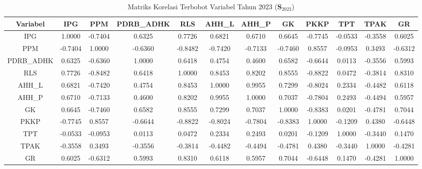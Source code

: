 \begin{table}[H]
\centering
\caption{Matriks Korelasi Terbobot Variabel Tahun 2023 ($\mathbf{S}_{2023}$)} \label{tab:appmatriks_intra_loading_2023}
\begin{adjustbox}{max width=\textwidth, max height=0.85\textheight}
\begin{tabular}{|c|c|c|c|c|c|c|c|c|c|c|c|}
\hline
\textbf{Variabel} & \textbf{IPG} & \textbf{PPM} & \textbf{PDRB\_ADHK} & \textbf{RLS} & \textbf{AHH\_L} & \textbf{AHH\_P} & \textbf{GK} & \textbf{PKKP} & \textbf{TPT} & \textbf{TPAK} & \textbf{GR} \\
\hline
IPG & 1.0000 & -0.7404 & 0.6325 & 0.7726 & 0.6821 & 0.6710 & 0.6645 & -0.7745 & -0.0533 & -0.3558 & 0.6025 \\
PPM & -0.7404 & 1.0000 & -0.6360 & -0.8482 & -0.7420 & -0.7133 & -0.7460 & 0.8557 & -0.0953 & 0.3493 & -0.6312 \\
PDRB\_ADHK & 0.6325 & -0.6360 & 1.0000 & 0.6418 & 0.4754 & 0.4600 & 0.6582 & -0.6644 & 0.0113 & -0.3556 & 0.5993 \\
RLS & 0.7726 & -0.8482 & 0.6418 & 1.0000 & 0.8453 & 0.8202 & 0.8555 & -0.8822 & 0.0472 & -0.3814 & 0.8310 \\
AHH\_L & 0.6821 & -0.7420 & 0.4754 & 0.8453 & 1.0000 & 0.9955 & 0.7299 & -0.8024 & 0.2334 & -0.4482 & 0.6118 \\
AHH\_P & 0.6710 & -0.7133 & 0.4600 & 0.8202 & 0.9955 & 1.0000 & 0.7037 & -0.7804 & 0.2493 & -0.4494 & 0.5957 \\
GK & 0.6645 & -0.7460 & 0.6582 & 0.8555 & 0.7299 & 0.7037 & 1.0000 & -0.8383 & 0.0201 & -0.4781 & 0.7044 \\
PKKP & -0.7745 & 0.8557 & -0.6644 & -0.8822 & -0.8024 & -0.7804 & -0.8383 & 1.0000 & -0.1209 & 0.4380 & -0.6448 \\
TPT & -0.0533 & -0.0953 & 0.0113 & 0.0472 & 0.2334 & 0.2493 & 0.0201 & -0.1209 & 1.0000 & -0.3440 & 0.1470 \\
TPAK & -0.3558 & 0.3493 & -0.3556 & -0.3814 & -0.4482 & -0.4494 & -0.4781 & 0.4380 & -0.3440 & 1.0000 & -0.4281 \\
GR & 0.6025 & -0.6312 & 0.5993 & 0.8310 & 0.6118 & 0.5957 & 0.7044 & -0.6448 & 0.1470 & -0.4281 & 1.0000 \\
\hline
\end{tabular}
\end{adjustbox}
\end{table}